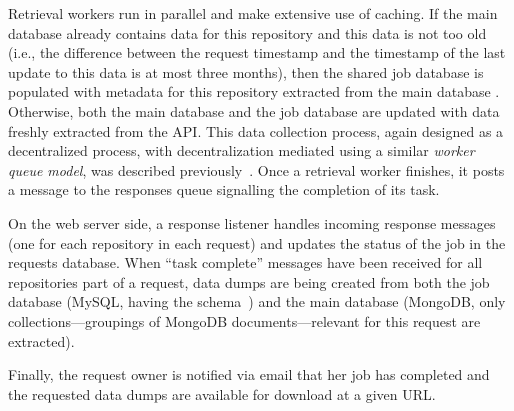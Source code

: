 Retrieval workers run in parallel and make extensive use of caching.
If the main \ght database already contains data for this repository and this data is not too old
(i.e., the difference between the request timestamp and the timestamp of the last update to this data is at
most three months), then the shared job database is populated with metadata for this
repository extracted from the main \ght database .
Otherwise, both the main \ght database and the job database  are updated with data freshly extracted
from the \gh API.
This data collection process, again designed as a decentralized process, with decentralization mediated 
using a similar \emph{worker queue model}, was described previously~\cite{gousios2013ghtorent}.
Once a retrieval worker finishes, it posts a message to the responses queue  signalling
the completion of its task.

On the web server side, a response listener handles incoming response messages (one for each repository
in each request)  and updates the status of the job in the requests database.
When ``task complete'' messages have been received for all repositories part of a request, data dumps
are being created from both the job database (MySQL, having the \ght schema~\cite{gousios2013ghtorent})
and the main \ght database (MongoDB, only collections---groupings of MongoDB documents---relevant for this
request are extracted).

Finally, the request owner is notified via email that her job has completed and the requested data dumps
are available for download at a given URL.


